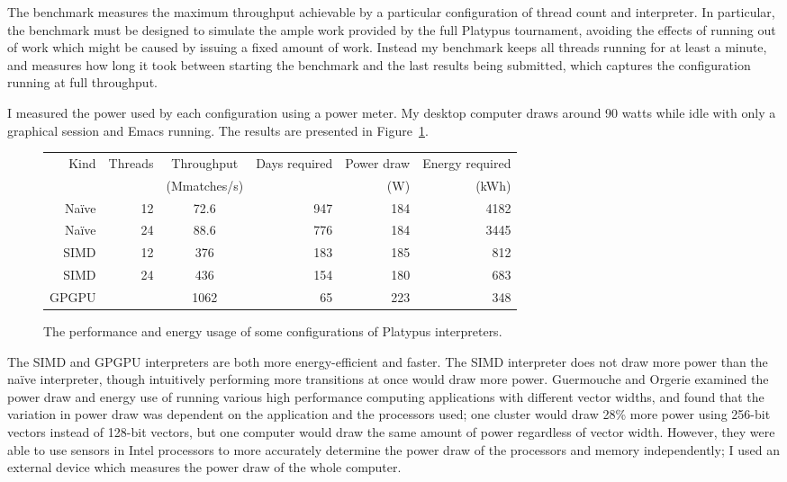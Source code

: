The benchmark measures the maximum throughput achievable by a particular
configuration of thread count and interpreter. In particular, the benchmark
must be designed to simulate the ample work provided by the full Platypus
tournament, avoiding the effects of running out of work which might be caused
by issuing a fixed amount of work. Instead my benchmark keeps all threads
running for at least a minute, and measures how long it took between starting
the benchmark and the last results being submitted, which captures the
configuration running at full throughput.

I measured the power used by each configuration using a power meter.
My desktop computer draws around 90 watts while idle with only a graphical
session and Emacs running. The results are presented in Figure~\ref{fig:benchmarks}.

\begin{figure}
  \begin{center}
    \begin{tabular}{|r r|S[table-format=4.1,mode=text] r r r|}
      \hline
      Kind & Threads & {Throughput} & Days required & Power draw & Energy required\\
           & & {(Mmatches/s)} & & (W) & (kWh) \\
      \hline
      Na\"ive & 12 & 72.6 & 947 & 184 & 4182 \\
      Na\"ive & 24 & 88.6 & 776 & 184 & 3445 \\
      SIMD & 12 & 376 & 183 & 185 & 812 \\
      SIMD & 24 & 436 & 154 & 180 & 683 \\
      GPGPU & & 1062 & 65 & 223 & 348 \\
      \hline
    \end{tabular}
  \end{center}
  \caption{The performance and energy usage of some configurations of Platypus interpreters.}
  \label{fig:benchmarks}
\end{figure}

The SIMD and GPGPU interpreters are both more energy-efficient and
faster. The SIMD interpreter does not draw more power than the na\"ive
interpreter, though intuitively performing more transitions at once
would draw more power. Guermouche and Orgerie \cite{vectorized}
examined the power draw and energy use of running various high
performance computing applications with different vector widths, and
found that the variation in power draw was dependent on the
application and the processors used; one cluster would draw 28\%
more power using 256-bit vectors instead of 128-bit vectors, but one
computer would draw the same amount of power regardless of vector
width. However, they were able to use sensors in Intel processors to
more accurately determine the power draw of the processors and
memory independently; I used an external device which measures
the power draw of the whole computer.


